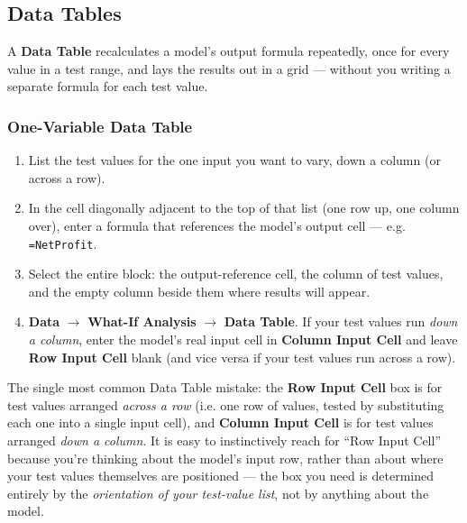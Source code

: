 \documentclass[11pt,a4paper]{article}
\begin{document}
\subsection{Data Tables}
\label{sec:datatables}

A \textbf{Data Table} recalculates a model's output formula repeatedly, once for every value in a test range, and lays the results out in a grid --- without you writing a separate formula for each test value.

\subsubsection{One-Variable Data Table}

\begin{formulasyntax}
\begin{enumerate}
  \item List the test values for the one input you want to vary, down a column (or across a row).
  \item In the cell diagonally adjacent to the top of that list (one row up, one column over), enter a formula that references the model's output cell --- e.g. \texttt{=NetProfit}.
  \item Select the entire block: the output-reference cell, the column of test values, and the empty column beside them where results will appear.
  \item \textbf{Data} $\rightarrow$ \textbf{What-If Analysis} $\rightarrow$ \textbf{Data Table}. If your test values run \emph{down a column}, enter the model's real input cell in \textbf{Column Input Cell} and leave \textbf{Row Input Cell} blank (and vice versa if your test values run across a row).
\end{enumerate}
\end{formulasyntax}

\begin{pitfall}
The single most common Data Table mistake: the \textbf{Row Input Cell} box is for test values arranged \emph{across a row} (i.e. one row of values, tested by substituting each one into a single input cell), and \textbf{Column Input Cell} is for test values arranged \emph{down a column}. It is easy to instinctively reach for ``Row Input Cell'' because you're thinking about the model's input row, rather than about where your test values themselves are positioned --- the box you need is determined entirely by the \emph{orientation of your test-value list}, not by anything about the model.
\end{pitfall}
\end{document}
